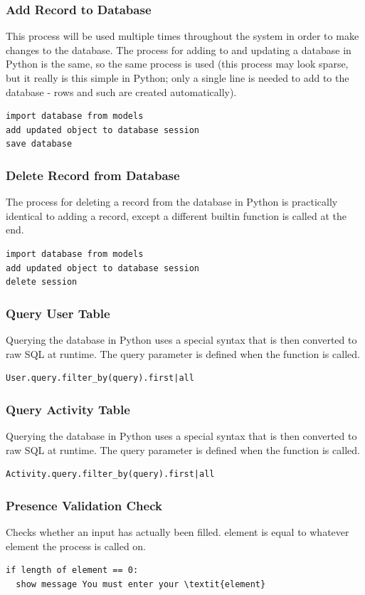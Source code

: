 \documentclass{article}[12pt,a4paper]
\begin{document}
\subsubsection{Add Record to Database}
This process will be used multiple times throughout the system in order to make changes to the database. The process for adding to and updating a database in Python is the same, so the same process is used (this process may look sparse, but it really is this simple in Python; only a single line is needed to add to the database - rows and such are created automatically).
\begin{verbatim}
import database from models
add updated object to database session
save database
\end{verbatim}

\subsubsection{Delete Record from Database}
The process for deleting a record from the database in Python is practically identical to adding a record, except a different builtin function is called at the end.
\begin{verbatim}
import database from models
add updated object to database session
delete session
\end{verbatim}

\subsubsection{Query User Table}
Querying the database in Python uses a special syntax that is then converted to raw SQL at runtime. The query parameter is defined when the function is called.
\begin{verbatim}
User.query.filter_by(query).first|all
\end{verbatim}

\subsubsection{Query Activity Table}
Querying the database in Python uses a special syntax that is then converted to raw SQL at runtime. The query parameter is defined when the function is called.
\begin{verbatim}
Activity.query.filter_by(query).first|all
\end{verbatim}


\subsubsection{Presence Validation Check}
Checks whether an input has actually been filled. element is equal to whatever element the process is called on.
\begin{verbatim}
if length of element == 0:
  show message You must enter your \textit{element}
\end{verbatim}
\end{document}
